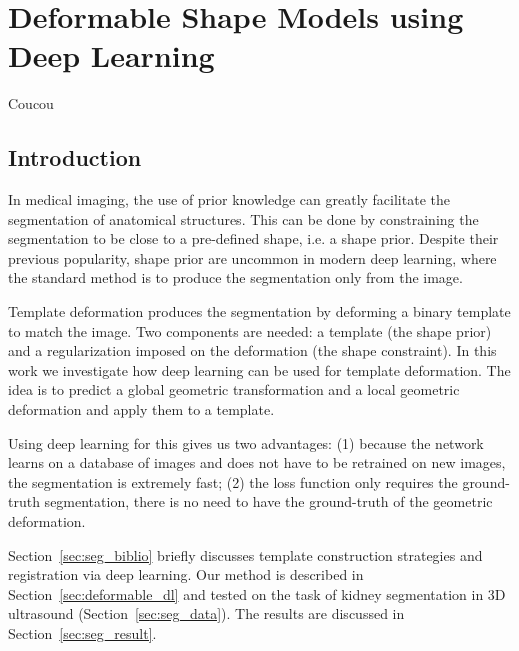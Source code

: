 \chapter{Deformable Shape Models using Deep Learning}
\label{chap:seg}

\begin{chapabstract}
 Coucou
\end{chapabstract}

\vspace{1cm}

{   
    \minitoc
}

\newpage

\section{Introduction}

In medical imaging, the use of prior knowledge can greatly facilitate the segmentation of anatomical structures. This can be done by constraining the segmentation to be close to a pre-defined shape, i.e. a shape prior. Despite their previous popularity, shape prior are uncommon in modern deep learning, where the standard method is to produce the segmentation only from the image. 

Template deformation produces the segmentation by deforming a binary template to match the image. Two components are needed: a template (the shape prior) and a regularization imposed on the deformation (the shape constraint). In this work we investigate how deep learning can be used for template deformation. The idea is to predict a global geometric transformation and a local geometric deformation and apply them to a template. 

Using deep learning for this gives us two advantages: (1) because the network learns on a database of images and does not have to be retrained on new images, the segmentation is extremely fast; (2) the loss function only requires the ground-truth segmentation, there is no need to have the ground-truth of the geometric deformation.

Section~\ref{sec:seg_biblio} briefly discusses template construction strategies and registration via deep learning. Our method is described in Section~\ref{sec:deformable_dl} and tested on the task of kidney segmentation in 3D ultrasound (Section~\ref{sec:seg_data}). The results are discussed in Section~\ref{sec:seg_result}.

